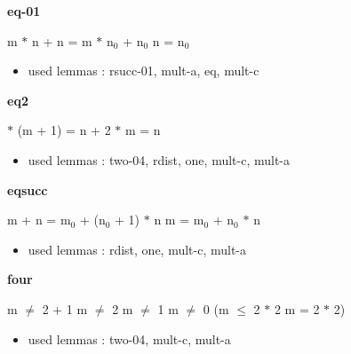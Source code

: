 \documentclass[a4paper]{article}
\begin{document}
\medskip

\bigskip

{\large\bf eq-01}

\medskip

 \Fol m $*$ n + n = m $*$ $\mbox{n}_{0}$ + $\mbox{n}_{0}$ \Equiv n = $\mbox{n}_{0}$

\begin{itemize}


\item       used lemmas  : rsucc-01, mult-a, eq, mult-c

\end{itemize}

\medskip

\bigskip

{\large\bf eq2}

\medskip

  $*$ (m + 1) = n + 2  $*$ m = n

\begin{itemize}


\item       used lemmas  : two-04, rdist, one, mult-c, mult-a

\end{itemize}

\medskip

\bigskip

{\large\bf eqsucc}

\medskip

 \Fol m + n = $\mbox{m}_{0}$ + ($\mbox{n}_{0}$ + 1) $*$ n \Equiv m = $\mbox{m}_{0}$ + $\mbox{n}_{0}$ $*$ n

\begin{itemize}


\item       used lemmas  : rdist, one, mult-c, mult-a

\end{itemize}

\medskip

\bigskip

{\large\bf four}

\medskip

 \Fol m $\neq$ 2 + 1 \And m $\neq$ 2 \And m $\neq$ 1 \And m $\neq$ 0 \Imp (m $\le$ 2 $*$ 2 \Equiv m = 2 $*$ 2)

\begin{itemize}


\item       used lemmas  : two-04, mult-c, mult-a

\end{itemize}
\end{document}

